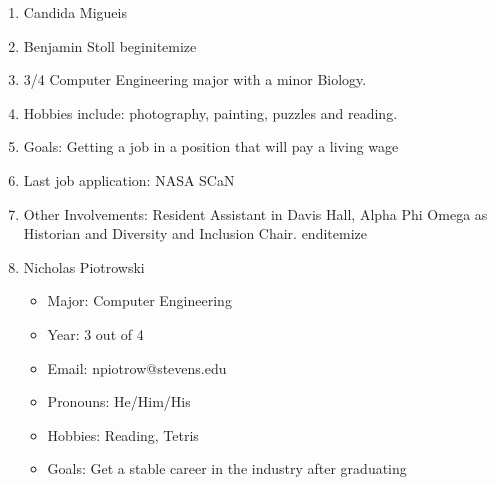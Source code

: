 \begin{enumerate}
    \item Candida Migueis
    \item Benjamin Stoll
        begin{itemize}
            \item 3/4 Computer Engineering major with a minor Biology. 
            \item Hobbies include: photography, painting, puzzles and reading.
            \item Goals: Getting a job in a position that will pay a living wage
            \item Last job application: NASA SCaN
            \item Other Involvements: Resident Assistant in Davis Hall, Alpha Phi Omega as Historian and Diversity and Inclusion Chair.
        end{itemize}
    \item Nicholas Piotrowski
        \begin{itemize}
        \item Major: Computer Engineering
        \item Year: 3 out of 4
        \item Email: npiotrow@stevens.edu
        \item Pronouns: He/Him/His
        \item Hobbies: Reading, Tetris
        \item Goals: Get a stable career in the industry after graduating
        \end{itemize}
\end{enumerate}

